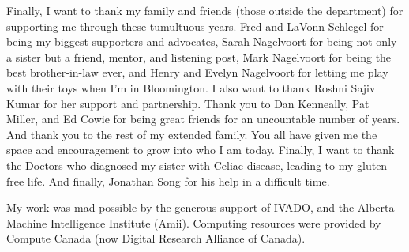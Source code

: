 \documentclass[\main/thesis.tex]{subfiles}
\begin{document}
\begin{acknowledgements}
Finally, I want to thank my family and friends (those outside the
department) for supporting me through these tumultuous years. Fred and
LaVonn Schlegel for being my biggest supporters and advocates, Sarah
Nagelvoort for being not only a sister but a friend, mentor, and
listening post, Mark Nagelvoort for being the best brother-in-law
ever, and Henry and Evelyn Nagelvoort for letting me play with their
toys when I'm in Bloomington. I also want to thank Roshni Sajiv Kumar
for her support and partnership. Thank you to Dan Kenneally, Pat Miller,
and Ed Cowie for being great friends for an uncountable number of
years. And thank you to the rest of my extended family. You all have
given me the space and encouragement to grow into who I am
today. Finally, I want to thank the Doctors who diagnosed my sister
with Celiac disease, leading to my gluten-free life. And finally,
Jonathan Song for his help in a difficult time.

My work was mad possible by the generous support of IVADO, and the
Alberta Machine Intelligence Institute (Amii). Computing resources
were provided by Compute Canada (now Digital Research Alliance of
Canada).

\end{acknowledgements}
\end{document}
